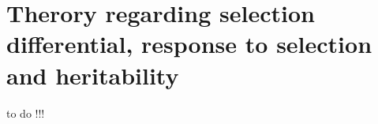 \section{Therory regarding selection differential, response to selection and heritability}
\label{text_SandR}


to do !!!

